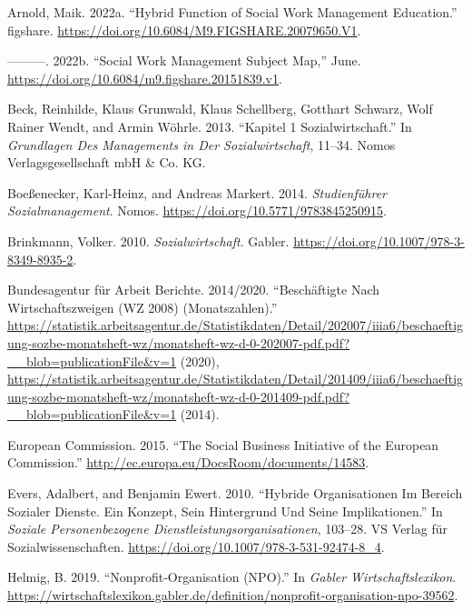 \documentclass[
  letterpaper,
]{book}
\newlength{\cslhangindent}
\newenvironment{CSLReferences}[2] %
 {\begin{list}{}{%
  \setlength{\itemindent}{0pt}
  \setlength{\leftmargin}{0pt}
  \setlength{\parsep}{0pt}
  \ifodd #1
   \setlength{\leftmargin}{\cslhangindent}
   \setlength{\itemindent}{-1\cslhangindent}
  \fi
  \setlength{\itemsep}{#2\baselineskip}}}
 {\end{list}}
\begin{document}
\label{refs}
\begin{CSLReferences}{1}{0}
Arnold, Maik. 2022a. {``Hybrid Function of Social Work Management
Education.''} figshare.
\url{https://doi.org/10.6084/M9.FIGSHARE.20079650.V1}.

---------. 2022b. {``{Social Work Management Subject Map},''} June.
\url{https://doi.org/10.6084/m9.figshare.20151839.v1}.

Beck, Reinhilde, Klaus Grunwald, Klaus Schellberg, Gotthart Schwarz,
Wolf Rainer Wendt, and Armin Wöhrle. 2013. {``Kapitel 1
Sozialwirtschaft.''} In \emph{Grundlagen Des Managements in Der
Sozialwirtschaft}, 11--34. Nomos Verlagsgesellschaft mbH \& Co. KG.

Boeßenecker, Karl-Heinz, and Andreas Markert. 2014. \emph{Studienführer
Sozialmanagement}. Nomos. \url{https://doi.org/10.5771/9783845250915}.

Brinkmann, Volker. 2010. \emph{Sozialwirtschaft}. Gabler.
\url{https://doi.org/10.1007/978-3-8349-8935-2}.

Bundesagentur für Arbeit Berichte. 2014/2020. {``Beschäftigte Nach
Wirtschaftszweigen (WZ 2008) (Monatszahlen).''}
\url{https://statistik.arbeitsagentur.de/Statistikdaten/Detail/202007/iiia6/beschaeftigung-sozbe-monatsheft-wz/monatsheft-wz-d-0-202007-pdf.pdf?__blob=publicationFile&v=1}
(2020),
\url{https://statistik.arbeitsagentur.de/Statistikdaten/Detail/201409/iiia6/beschaeftigung-sozbe-monatsheft-wz/monatsheft-wz-d-0-201409-pdf.pdf?__blob=publicationFile&v=1}
(2014).

European Commission. 2015. {``The Social Business Initiative of the
European Commission.''}
\url{http://ec.europa.eu/DocsRoom/documents/14583}.

Evers, Adalbert, and Benjamin Ewert. 2010. {``Hybride Organisationen Im
Bereich Sozialer Dienste. Ein Konzept, Sein Hintergrund Und Seine
Implikationen.''} In \emph{Soziale Personenbezogene
Dienstleistungsorganisationen}, 103--28. VS Verlag für
Sozialwissenschaften. \url{https://doi.org/10.1007/978-3-531-92474-8_4}.

Helmig, B. 2019. {``Nonprofit-Organisation (NPO).''} In \emph{Gabler
Wirtschaftslexikon}.
\url{https://wirtschaftslexikon.gabler.de/definition/nonprofit-organisation-npo-39562}.


\end{CSLReferences}
\end{document}
